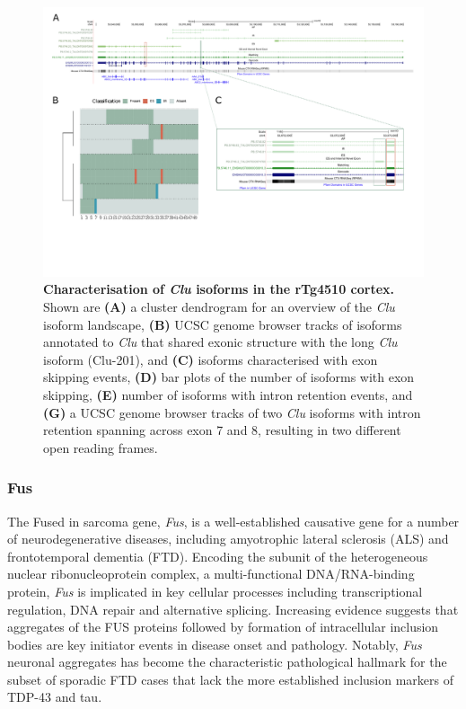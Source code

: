 \begin{landscape}
	\begin{figure}[htp]
		\centering
		\captionsetup{width=1.3\textwidth}
		\includegraphics[page=6,trim={0 1.5cm 0 0},scale = 0.85]{Figures/TargetGenes_Annotation_Landscape.pdf}
		\caption[Characterisation of the \textit{Clu} isoform landscape]%
		{\textbf{Characterisation of \textit{Clu} isoforms in the rTg4510 cortex.} Shown are \textbf{(A)} a cluster dendrogram for an overview of the \textit{Clu} isoform landscape, \textbf{(B)} UCSC genome browser tracks of isoforms annotated to \textit{Clu} that shared exonic structure with the long \textit{Clu} isoform (Clu-201), and \textbf{(C)} isoforms characterised with exon skipping events, \textbf{(D)} bar plots of the number of isoforms with exon skipping, \textbf{(E)} number of isoforms with intron retention events, and \textbf{(G)} a UCSC genome browser tracks of two \textit{Clu} isoforms with intron retention spanning across exon 7 and 8, resulting in two different open reading frames.}    
		\label{fig:clu}
	\end{figure}
\end{landscape}
\restoregeometry



\newpage
\subsubsection{Fus}
The Fused in sarcoma gene, \textit{Fus}, is a well-established causative gene for a number of neurodegenerative diseases, including amyotrophic lateral sclerosis (ALS) and frontotemporal dementia (FTD). Encoding the subunit of the heterogeneous nuclear ribonucleoprotein complex, a multi-functional DNA/RNA-binding protein,  \textit{Fus} is implicated in key cellular processes including transcriptional regulation, DNA repair and alternative splicing\cite{Shelkovnikova2014}. Increasing evidence suggests that aggregates of the FUS proteins followed by formation of intracellular inclusion bodies are key initiator events in disease onset and pathology\cite{Shelkovnikova2014}. Notably, \textit{Fus} neuronal aggregates has become the characteristic pathological hallmark for the subset of sporadic FTD cases that lack the more established inclusion markers of TDP-43 and tau\cite{Seelaar2010}.

